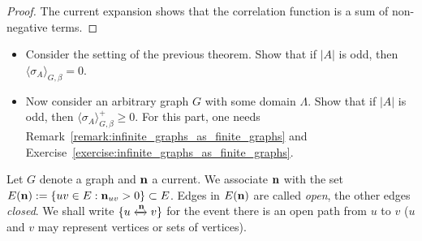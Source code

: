 \begin{proof}
    The current expansion shows that the correlation function is a sum of
    non-negative terms.
\end{proof}

\begin{exercise}
    \begin{itemize}
        \item     Consider the setting of the previous theorem.
        Show that if $|A|$ is odd, then $\langle\sigma_A\rangle_{G,\beta}=0$.
        \item Now consider an arbitrary graph $G$ with some domain $\Lambda$.
        Show that if $|A|$ is odd, then $\langle\sigma_A\rangle_{G,\beta}^+\geq 0$.
        For this part, one needs Remark~\ref{remark:infinite_graphs_as_finite_graphs}
        and Exercise~\ref{exercise:infinite_graphs_as_finite_graphs}.
    \end{itemize}
\end{exercise}

\begin{definition}
    Let $G$ denote a graph and $\mathbf{n}$ a current.
    We associate $\mathbf{n}$ with the set $E(\mathbf{n}):=\{uv\in E:\mathbf{n}_{uv}>0\}\subset E$.
    Edges in $E(\mathbf{n})$ are called \emph{open},
    the other edges \emph{closed}.
    We shall write $\{u\xleftrightarrow{\mathbf{n}}v\}$
    for the event there is an open path from $u$ to $v$
    ($u$ and $v$ may represent vertices or sets of vertices).
\end{definition}

